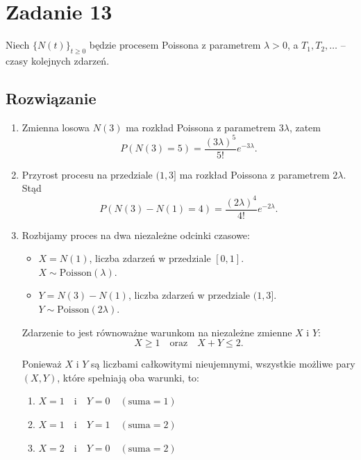 \section{Zadanie 13}
Niech \(\{N(t)\}_{t\ge 0}\) będzie procesem Poissona z parametrem \(\lambda>0\), a
\(T_1,T_2,\dots\) – czasy kolejnych zdarzeń.
\subsection*{Rozwiązanie}
\begin{enumerate}
	\item[(i)]
	      Zmienna losowa \(N(3)\) ma rozkład Poissona z parametrem \(3\lambda\), zatem
	      \[
		      P(N(3)=5)=\frac{(3\lambda)^5}{5!}e^{-3\lambda}.
	      \]

	\item[(ii)]
	      Przyrost procesu na przedziale \((1,3]\) ma rozkład Poissona z parametrem
	      \(2\lambda\). Stąd
	      \[
		      P(N(3)-N(1)=4)=\frac{(2\lambda)^4}{4!}e^{-2\lambda}.
	      \]

	\item[(iii)]
	      Rozbijamy proces na dwa niezależne odcinki czasowe:
	      \begin{itemize}
		      \item \(X = N(1)\), liczba zdarzeń w przedziale \([0, 1]\). \\\(X \sim \mathrm{Poisson}(\lambda)\).
		      \item \(Y = N(3)-N(1)\), liczba zdarzeń w przedziale \((1, 3]\). \\\(Y \sim \mathrm{Poisson}(2\lambda)\).
	      \end{itemize}
	      Zdarzenie to jest równoważne warunkom na niezależne zmienne \(X\) i \(Y\):
	      \[X\ge 1 \quad \text{oraz} \quad X+Y\le 2.\]

	      Ponieważ \(X\) i \(Y\) są liczbami całkowitymi nieujemnymi, wszystkie możliwe pary \((X, Y)\), które spełniają oba warunki, to:
	      \begin{enumerate}
		      \item \(X=1 \quad \text{i} \quad Y=0 \quad (\text{suma}=1)\)
		      \item \(X=1 \quad \text{i} \quad Y=1 \quad (\text{suma}=2)\)
		      \item \(X=2 \quad \text{i} \quad Y=0 \quad (\text{suma}=2)\)
	      \end{enumerate}


\end{enumerate}
